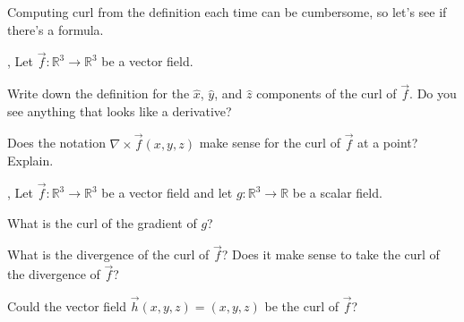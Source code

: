\documentclass[letter]{article}
\newcommand{\R}{\mathbb{R}}
\renewcommand{\d}{\mathrm{d}}
\renewcommand{\emph}[1]{{\color{defcolor} \textbf{\textit{##1}}}}
\begin{document}
	Computing curl from the definition each time can be cumbersome, so let's see
	if there's a formula.
	
	\sep
	Let $\vec f:\R^3\to\R^3$ be a vector field.
	\begin{Enum}
		\item Write down the definition
			for the $\hat x$, $\hat y$, and $\hat z$ components of the curl of $\vec f$.
			Do you see anything that looks like a derivative?
		\item Does the notation $\nabla \times \vec f(x,y,z)$ make sense for the curl of
			$\vec f$ at a point?  Explain.
	\end{Enum}

	\sep
	Let $\vec f:\R^3\to\R^3$ be a vector field and let $g:\R^3\to \R$ be a scalar field.
	\begin{Enum}
		\item What is the curl of the gradient of $g$?
		\item What is the divergence of the curl of $\vec f$?  Does it
			make sense to take the curl of the divergence of $\vec f$?
		\item Could the vector field $\vec h(x,y,z) = (x,y,z)$ be the curl
			of $\vec f$?
	\end{Enum}

	\vspace{-1cm}


%
%
%
\end{document}

